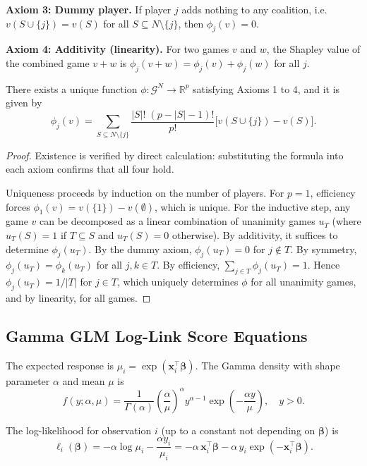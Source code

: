 \noindent\textbf{Axiom 3: Dummy player.}
If player $j$ adds nothing to any coalition, i.e.\ $v(S \cup \{j\}) = v(S)$ for all $S \subseteq N \setminus \{j\}$, then $\phi_j(v) = 0$.

\noindent\textbf{Axiom 4: Additivity (linearity).}
For two games $v$ and $w$, the Shapley value of the combined game $v + w$ is $\phi_j(v + w) = \phi_j(v) + \phi_j(w)$ for all $j$.

\begin{theorem}[Shapley, 1953]
\label{thm:shapley_uniqueness}
There exists a unique function $\phi : \mathcal{G}^N \to \mathbb{R}^p$ satisfying Axioms 1 to 4, and it is given by
\[
  \phi_j(v) = \sum_{S \subseteq N \setminus \{j\}} \frac{|S|!\;(p - |S| - 1)!}{p!} \bigl[ v(S \cup \{j\}) - v(S) \bigr].
\]
\end{theorem}

\begin{proof}
Existence is verified by direct calculation: substituting the formula into each axiom confirms that all four hold.

Uniqueness proceeds by induction on the number of players. For $p = 1$, efficiency forces $\phi_1(v) = v(\{1\}) - v(\emptyset)$, which is unique. For the inductive step, any game $v$ can be decomposed as a linear combination of unanimity games $u_T$ (where $u_T(S) = 1$ if $T \subseteq S$ and $u_T(S) = 0$ otherwise). By additivity, it suffices to determine $\phi_j(u_T)$. By the dummy axiom, $\phi_j(u_T) = 0$ for $j \notin T$. By symmetry, $\phi_j(u_T) = \phi_k(u_T)$ for all $j, k \in T$. By efficiency, $\sum_{j \in T} \phi_j(u_T) = 1$. Hence $\phi_j(u_T) = 1/|T|$ for $j \in T$, which uniquely determines $\phi$ for all unanimity games, and by linearity, for all games.
\end{proof}

\subsection{Gamma GLM Log-Link Score Equations}
\label{annexure:glm_score}

The expected response is $\mu_i = \exp(\mathbf{x}_i^\top \boldsymbol{\beta})$. The Gamma density with shape parameter $\alpha$ and mean $\mu$ is
\[
  f(y; \alpha, \mu) = \frac{1}{\Gamma(\alpha)} \left( \frac{\alpha}{\mu} \right)^\alpha y^{\alpha - 1} \exp\!\left( -\frac{\alpha y}{\mu} \right), \quad y > 0.
\]

The log-likelihood for observation $i$ (up to a constant not depending on $\boldsymbol{\beta}$) is
\[
  \ell_i(\boldsymbol{\beta}) = -\alpha \log \mu_i - \frac{\alpha y_i}{\mu_i} = -\alpha \, \mathbf{x}_i^\top \boldsymbol{\beta} - \alpha \, y_i \exp(-\mathbf{x}_i^\top \boldsymbol{\beta}).
\]


